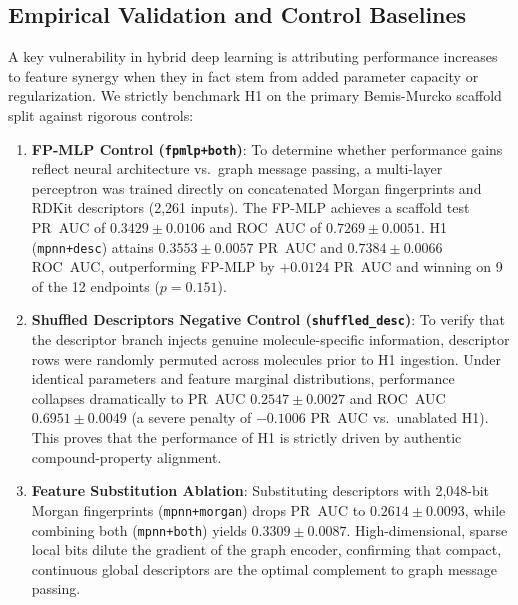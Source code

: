 \subsection{Empirical Validation and Control Baselines}
A key vulnerability in hybrid deep learning is attributing performance increases to feature synergy when they in fact stem from added parameter capacity or regularization. We strictly benchmark H1 on the primary Bemis-Murcko scaffold split against rigorous controls:
\begin{enumerate}
    \item \textbf{FP-MLP Control (\texttt{fpmlp+both})}: To determine whether performance gains reflect neural architecture vs.\ graph message passing, a multi-layer perceptron was trained directly on concatenated Morgan fingerprints and RDKit descriptors (2,261 inputs). The FP-MLP achieves a scaffold test PR~AUC of $0.3429 \pm 0.0106$ and ROC~AUC of $0.7269 \pm 0.0051$. H1 (\texttt{mpnn+desc}) attains $0.3553 \pm 0.0057$ PR~AUC and $0.7384 \pm 0.0066$ ROC~AUC, outperforming FP-MLP by $+0.0124$ PR~AUC and winning on 9 of the 12 endpoints ($p = 0.151$).
    \item \textbf{Shuffled Descriptors Negative Control (\texttt{shuffled\_desc})}: To verify that the descriptor branch injects genuine molecule-specific information, descriptor rows were randomly permuted across molecules prior to H1 ingestion. Under identical parameters and feature marginal distributions, performance collapses dramatically to PR~AUC $0.2547 \pm 0.0027$ and ROC~AUC $0.6951 \pm 0.0049$ (a severe penalty of $-0.1006$ PR~AUC vs.\ unablated H1). This proves that the performance of H1 is strictly driven by authentic compound-property alignment.
    \item \textbf{Feature Substitution Ablation}: Substituting descriptors with 2,048-bit Morgan fingerprints (\texttt{mpnn+morgan}) drops PR~AUC to $0.2614 \pm 0.0093$, while combining both (\texttt{mpnn+both}) yields $0.3309 \pm 0.0087$. High-dimensional, sparse local bits dilute the gradient of the graph encoder, confirming that compact, continuous global descriptors are the optimal complement to graph message passing.
\end{enumerate}

